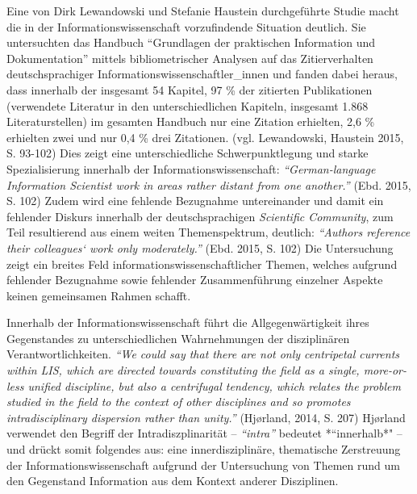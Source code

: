 \documentclass[a4paper,
fontsize=11pt,
oneside,
numbers=noperiodatend,
parskip=half-,
bibliography=totoc,
final
]{scrartcl}
\begin{document}
Eine von Dirk Lewandowski und Stefanie Haustein durchgeführte Studie
macht die in der Informationswissenschaft vorzufindende Situation
deutlich. Sie untersuchten das Handbuch \enquote{Grundlagen der
praktischen Information und Dokumentation} mittels bibliometrischer
Analysen auf das Zitierverhalten deutschsprachiger
Informationswissenschaftler\_innen und fanden dabei heraus, dass
innerhalb der insgesamt 54 Kapitel, 97 \% der zitierten Publikationen
(verwendete Literatur in den unterschiedlichen Kapiteln, insgesamt 1.868
Literaturstellen) im gesamten Handbuch nur eine Zitation erhielten, 2,6
\% erhielten zwei und nur 0,4 \% drei Zitationen. (vgl. Lewandowski,
Haustein 2015, S. 93-102) Dies zeigt eine unterschiedliche
Schwerpunktlegung und starke Spezialisierung innerhalb der
Informationswissenschaft: \emph{\enquote{German-language Information
Scientist work in areas rather distant from one another.}} (Ebd. 2015,
S. 102) Zudem wird eine fehlende Bezugnahme untereinander und damit ein
fehlender Diskurs innerhalb der deutschsprachigen \emph{Scientific
Community}, zum Teil resultierend aus einem weiten Themenspektrum,
deutlich: \emph{\enquote{Authors reference their colleagues` work only
moderately.}} (Ebd. 2015, S. 102) Die Untersuchung zeigt ein breites
Feld informationswissenschaftlicher Themen, welches aufgrund fehlender
Bezugnahme sowie fehlender Zusammenführung einzelner Aspekte keinen
gemeinsamen Rahmen schafft.

Innerhalb der Informationswissenschaft führt die Allgegenwärtigkeit
ihres Gegenstandes zu unterschiedlichen Wahrnehmungen der disziplinären
Verantwortlichkeiten. \emph{\enquote{We could say that there are not
only centripetal currents within LIS, which are directed towards
constituting the field as a single, more-or-less unified discipline, but
also a centrifugal tendency, which relates the problem studied in the
field to the context of other disciplines and so promotes
intradisciplinary dispersion rather than unity.}} (Hjørland, 2014, S.
207) Hjørland verwendet den Begriff der Intradiszplinarität --
\emph{\enquote{intra}} bedeutet *``innerhalb*" -- und drückt somit
folgendes aus: eine innerdisziplinäre, thematische Zerstreuung der
Informationswissenschaft aufgrund der Untersuchung von Themen rund um
den Gegenstand Information aus dem Kontext anderer Disziplinen.
\end{document}
